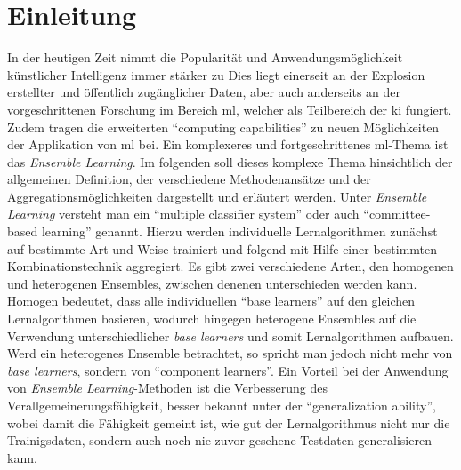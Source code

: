
\cleartoleftpage

\thispagestyle{empty}
\vspace*{\fill}
\newpage

\onehalfspacing
{}
\setcounter{page}{1}
\pagestyle{scrheadings}

\section{Einleitung}

In der heutigen Zeit nimmt die Popularität und Anwendungsmöglichkeit künstlicher Intelligenz immer stärker zu \autocite[S.1]{Boutaba.2018}
Dies liegt einerseit an der Explosion erstellter und öffentlich zugänglicher Daten, aber auch anderseits an der vorgeschrittenen Forschung im Bereich \gls{ml}, welcher als Teilbereich der \gls{ki} fungiert. Zudem tragen die erweiterten \enquote{computing capabilities} \autocite[S.1]{Boutaba.2018} zu neuen Möglichkeiten der Applikation von \gls{ml} bei. Ein komplexeres und fortgeschrittenes \gls{ml}-Thema ist das \textit{Ensemble Learning}. Im folgenden soll dieses komplexe Thema hinsichtlich der allgemeinen Definition, der verschiedene Methodenansätze und der Aggregationsmöglichkeiten dargestellt und erläutert werden. Unter \textit{Ensemble Learning} versteht man ein \enquote{multiple classifier system}\autocite[S.182]{Zhou.2021} oder auch \enquote{committee-based learning}\autocite[S.15]{Zhou.2012} genannt. Hierzu werden individuelle Lernalgorithmen zunächst auf bestimmte Art und Weise trainiert und folgend mit Hilfe einer bestimmten Kombinationstechnik aggregiert. Es gibt zwei verschiedene Arten, den homogenen und heterogenen Ensembles, zwischen denenen unterschieden werden kann. Homogen bedeutet, dass alle individuellen \enquote{base learners}\autocite[S.182]{Zhou.2021} auf den gleichen Lernalgorithmen basieren, wodurch hingegen heterogene Ensembles auf die Verwendung unterschiedlicher \textit{base learners} und somit Lernalgorithmen aufbauen. Werd ein heterogenes Ensemble betrachtet, so spricht man jedoch nicht mehr von \textit{base learners}, sondern von \enquote{component learners}\autocite[S.15]{Zhou.2012}. Ein Vorteil bei der Anwendung von \textit{Ensemble Learning}-Methoden ist die Verbesserung des Verallgemeinerungsfähigkeit, besser bekannt unter der \enquote{generalization ability}\autocite[S.15]{Zhou.2021}, wobei damit die Fähigkeit gemeint ist, wie gut der Lernalgorithmus nicht nur die Trainigsdaten, sondern auch noch nie zuvor gesehene Testdaten generalisieren kann.

